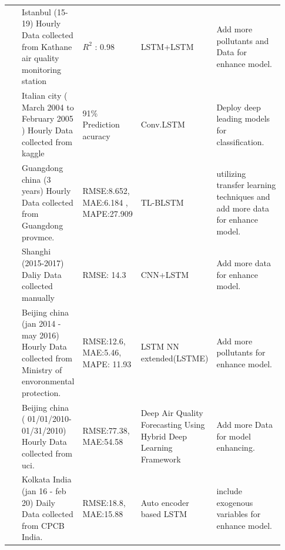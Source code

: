 \documentclass[a4paper,fleqn]{cas-sc}
\begin{document}
\begin{landscape}
{\begin{longtable}[h!]{ p{0.1\linewidth} p{0.2\linewidth} p{0.14\linewidth} p{0.11\linewidth} p{0.38\linewidth} }
 \cite{eren2023predicting}         & Istanbul (15-19) Hourly Data   collected from Kathane air quality monitoring station                     & $R^2$ : 0.98                                                                                               & LSTM+LSTM                                                           & Add more pollutants and Data for enhance model.           \\
\cite{zhu2023deep}           & Italian city ( March 2004 to   February 2005 ) Hourly Data collected from kaggle                         & 91\% Prediction acuracy                                                                                 & Conv.LSTM                                                           & Deploy deep leading models for classification.  \\
 \cite{ma2019improving}               & Guangdong china (3 years) Hourly   Data collected from Guangdong  provmce.                               & RMSE:8.652, MAE:6.184 ,   MAPE:27.909                                                                   & TL-BLSTM                                                            & utilizing transfer learning techniques and add more data for enhance model.     \\
\cite{qin2019novel}       & Shanghi (2015-2017) Daliy Data collected   manually  & RMSE: 14.3   & CNN+LSTM     &  Add more data for enhance model. \\
 \cite{li2017long}          & Beijing china (jan 2014 -may   2016) Hourly Data collected from Ministry of envoronmental protection.    & RMSE:12.6, MAE:5.46, MAPE: 11.93                                                                        & LSTM NN extended(LSTME)                                             & Add more pollutants for enhance model.                                           \\
 \cite{du2019deep}         & Beijing china (   01/01/2010-01/31/2010) Hourly Data collected from uci.                                 & RMSE:77.38, MAE:54.58                                                                                   & Deep Air Quality Forecasting   Using Hybrid Deep Learning Framework & Add more Data for model enhancing.\\
\cite{nath2021long}       & Kolkata India (jan 16 - feb   20)  Daily Data collected from CPCB   India.                               & RMSE:18.8, MAE:15.88                                                                                    & Auto encoder based LSTM                                             &  include exogenous variables for enhance model. \\ \hline
  \end{longtable}}
  \end{landscape}
\end{document}
